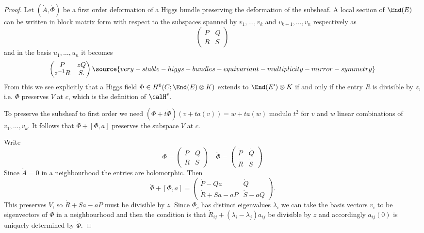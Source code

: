 \begin{proof}
	Let $(\dot A,\dot\Phi)$ be a first order deformation of a Higgs bundle preserving the deformation of the subsheaf.
	A  local section of $\End (E)$ can be written in block matrix form with respect to the subspaces  spanned by $v_1,\dots, v_k$ and $v_{k+1},\dots, v_n$ respectively as
	$$\begin{pmatrix}  P & Q\\
	R & S\end{pmatrix} $$ and  in the basis $u_1,\dots, u_n$ it becomes
	\begin{equation}
	\begin{pmatrix}  P & zQ\\
	z^{-1}R & S .\end{pmatrix}
	\label{matrix1}
\source{very-stable-higgs-bundles-equivariant-multiplicity-mirror-symmetry}
	\end{equation}
	From this we see explicitly that  a Higgs field $\Phi\in H^0(C;\End (E)\otimes K)$  extends to $\End (E')\otimes K$ if  and only if  the entry $R$ is divisible by $z$, i.e. $\Phi$ preserves $V$ at $c$, which is the definition of $\calH^s$.





	To preserve the subsheaf to first order we need
	$(\Phi+t\dot\Phi)(v+ta(v))=w+ta(w)$ modulo $t^2$
	for $v$ and $w$ linear combinations of  $v_1,\dots,v_k$. It follows that  $\dot\Phi+[\Phi,a]$ preserves the subspace $V$ at $c$.


	Write $$\Phi=\begin{pmatrix}  P & Q\\
	R & S\end{pmatrix}\quad \dot\Phi=\begin{pmatrix}  \dot P & \dot Q\\
	\dot R & \dot S\end{pmatrix}$$
	Since $\dot A=0$ in a neighbourhood the entries are holomorphic.
	Then
	$$\dot\Phi+[\Phi,a]=\begin{pmatrix}  \dot P- Qa& \dot Q\\
	\dot R +Sa-aP& \dot S-aQ\end{pmatrix}.$$
	This  preserves $V$, so $\dot R +Sa-aP$ must be divisible by $z$.  Since $\Phi_c$ has distinct eigenvalues $\lambda_i$ we can take the basis vectors $v_i$ to be eigenvectors of $\Phi$ in a neighbourhood and then the condition is that
	$\dot R_{ij}+(\lambda_i-\lambda_j)a_{ij}$ be divisible by $z$ and accordingly  $a_{ij}(0)$ is uniquely determined by $\dot \Phi$.


\end{proof}
